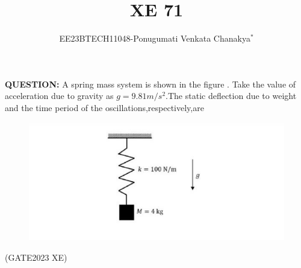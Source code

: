 \documentclass[journal,12pt,twocolumn]{IEEEtran}
\theoremstyle{remark}
\begin{document}
 
 \vspace{3cm}
 \title{\textbf{XE 71}}
 \author{EE23BTECH11048-Ponugumati Venkata Chanakya$^{*}$%
 }
 \maketitle
 \newpage
 \bigskip
 \renewcommand{\thefigure}{\theenumi}
 \renewcommand{\thetable}{\theenumi}
 \textbf{QUESTION:}
 A spring mass system is shown in the figure . Take the value of acceleration  due to gravity as $g=9.81m/s^2$.The static deflection due to weight and the time period of the oscillations,respectively,are\\
 \begin{figure}[h!]
    \centering
    \includegraphics[width = \columnwidth]{2023/XE/71/figs/xe_71_f1.png}
\end{figure}
\hfill{(GATE2023 XE)}\\
\solution
\fi
\end{document}
